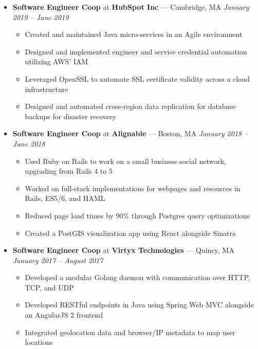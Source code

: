 \documentclass{article}
\begin{document}
\begin{itemize}[label={},leftmargin=*]
  \item \textbf{Software Engineer Coop} at \textbf{HubSpot Inc} --- Cambridge, MA \hfill {\em January 2019 -- June 2019}
  \begin{itemize}[label={$\bullet$}]
    \item Created and maintained Java micro-services in an Agile environment
    \item Designed and implemented engineer and service credential automation utilizing AWS' IAM
    \item Leveraged OpenSSL to automate SSL certificate validity across a cloud infrastructure
    \item Designed and automated cross-region data replication for database backups for disaster recovery

  \end{itemize}

  \item \textbf{Software Engineer Coop} at \textbf{Alignable} --- Boston, MA \hfill {\em January 2018 -- June 2018}
  \begin{itemize}[label={$\bullet$}]
    \item Used Ruby on Rails to work on a small business social network, upgrading from Rails 4 to 5
    \item Worked on full-stack implementations for webpages and resources in Rails, ES5/6, and HAML
    \item Reduced page load times by 90\% through Postgres query optimizations 
    \item Created a PostGIS visualization app using React alongside Sinatra

  \end{itemize}

  \item \textbf{Software Engineer Coop} at \textbf{Virtyx Technologies} --- Quincy, MA \hfill {\em January 2017 -- August 2017}
  \begin{itemize}[label={$\bullet$}]
    \item Developed a modular Golang daemon with communication over HTTP, TCP, and UDP
    \item Developed RESTful endpoints in Java using Spring Web MVC alongside an AngularJS 2 frontend
    \item Integrated geolocation data and browser/IP metadata to map user locations

  \end{itemize}
\end{itemize}
\end{document}
